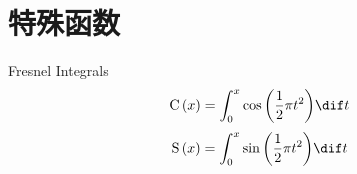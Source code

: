 \documentclass[color=green,titlestyle=hang]{elegantbook}%
\begin{document}
\chapter{特殊函数}

%

\begin{newdef}[菲涅尔积分函数]
Fresnel Integrals\[{\rm C}\left( x \right) = \int_0^x {\cos \left( {\frac{1}{2}\pi {t^2}} \right)} \dif t\]
\[{\rm S}\left( x \right) = \int_0^x {\sin \left( {\frac{1}{2}\pi {t^2}} \right)} \dif t\]
\end{newdef}
\end{document}
